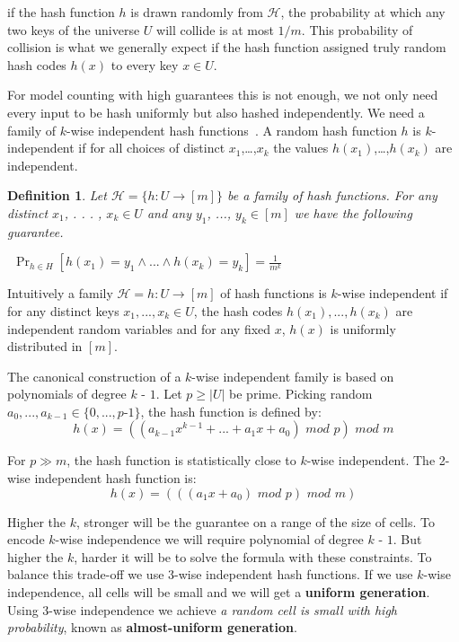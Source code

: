\documentclass{article}
\newtheorem{definition}{Definition}
\newcommand{\hash}{$\mathcal{H}$}
\begin{document}
if the hash function $h$ is drawn randomly from \hash, the probability at which any two keys of the universe $U$ will collide is at most $1/m$.
%
This probability of collision is what we generally expect if the hash function assigned truly random hash codes $h(x)$ to every key $x \in U$.

For model counting with high guarantees this is not enough, we not only need every input to be hash uniformly but also hashed independently. We need a family of $k$-wise independent hash functions~\cite{DBLP:conf/focs/WegmanC79}.
%
A random hash function $h$ is $k$-independent if for all choices of distinct $x_1$,…,$x_k$ the values $h(x_1)$,…,$h(x_k)$ are independent.
\begin{definition}
	Let $\mathcal{H}=\{h: U \to [m]\}$ be a family of hash functions. For any distinct $x_1$, . . . , $x_k \in U$ and any $y_1$, ..., $y_k \in [m]$ we have the following guarantee.

	$~~\Pr_{h\in H}
	[h(x_1) = y_1 \land ... \land h(x_k) = y_k] = \frac {1}
	{m^
		k}$
\end{definition}

Intuitively a family $\mathcal{H} = {h : U \to [m]}$ of hash functions
is $k$-wise independent if for any distinct keys $x_1, ..., x_k \in U$, the hash codes $h(x_1), ..., h(x_k)$ are independent random variables and for any fixed $x$, $h(x)$ is uniformly distributed in $[m]$.

The canonical construction of a $k$-wise independent family is based on polynomials
of degree $k$ - $1$. Let $p \geq |U|$ be prime. Picking random $a_0,...,a_{k - 1} \in \{0, . . . , p$-$ 1\}$,
the hash function is defined by:
\[ h(x) = ( ( a_{k-1} x^ {k - 1} + ... + a_1 x + a_0) \,\, mod \,\, p) \,\, mod \,\,  m\]


For $p \gg	 m$, the hash function is statistically close to $k$-wise independent. The 2-wise independent hash function is:
\[ h(x) = (((a_1 x + a_0) \,\, mod \,\, p) \,\, mod \,\, m ) \]


Higher the $k$, stronger will be the guarantee on a range of the size of cells. 
%
To encode $k$-wise independence we will require polynomial of degree $k$ - $1$.
%
But higher the $k$, harder it will be to solve the formula with these constraints. 
%
To balance this trade-off we use 3-wise independent hash functions.
%
If we use $k$-wise independence, all cells will be small and we will get a \textbf{uniform generation}. 
%
Using $3$-wise independence we achieve \emph{a random cell is small with high probability}, known as \textbf{almost-uniform generation}.
\end{document}
